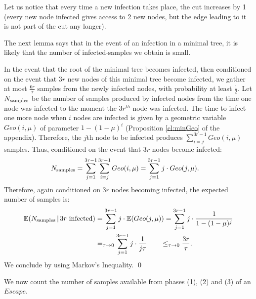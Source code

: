 Let us notice that every time a new infection takes place, the cut increases by 1 (every new node infected gives access to 2 new nodes, but the edge leading to it is not part of the cut any longer).

The next lemma says that in the event of an infection in a minimal tree, it is likely that the number of infected-samples we obtain is small.

\begin{lemma}\label{lem:nSamples} 
In the event that the root of the minimal tree becomes infected, then conditioned on the event that $3r$ new nodes of this minimal tree become infected, we gather at most $\frac{6r}{\tau}$ samples from the newly infected nodes, with probability at least $\frac{1}{2}$.
\proof Let $N_{\rm samples}$ be the number of samples produced by infected nodes from the time one node was infected to the moment the $3r^{th}$ node was infected. The time to infect one more node when $i$ nodes are infected is given by a geometric variable $Geo(i,\mu)$ of parameter $1-(1-\mu)^i$ (Proposition \ref{cl:minGeo} of the appendix). Therefore, the $j$th node to be infected produces $\sum_{i=j}^{3r-1} Geo(i,\mu)$ samples. Thus, conditioned on the event that $3r$ nodes become infected:
\begin{align*}
N_{\rm samples} &= \sum_{j=1}^{3r-1} \sum_{i=j}^{3r-1} Geo(i,\mu) = \sum_{j=1}^{3r-1} j\cdot Geo(j,\mu) .
\end{align*}
Therefore, again conditioned on $3r$ nodes becoming infected, the expected number of samples is:
\begin{align*}
\mathbb{E}(N_{\rm samples} \,| \, \mbox{$3r$ infected}) &= \sum_{j=1}^{3r-1} j\cdot \mathbb{E}(Geo(j,\mu)) = \sum_{j=1}^{3r-1} j\cdot \frac{1}{1-(1-\mu)^j} \\
&=_{\tau \to 0} \sum_{j=1}^{3r-1} j\cdot  \frac{1}{j\tau} \qquad \leq_{\tau \to 0} \frac{3r}{\tau}.
\end{align*}
We conclude by using Markov's Inequality.
\qed
\end{lemma}

We now count the number of samples available from phases (1), (2) and (3) of an $Escape$.

